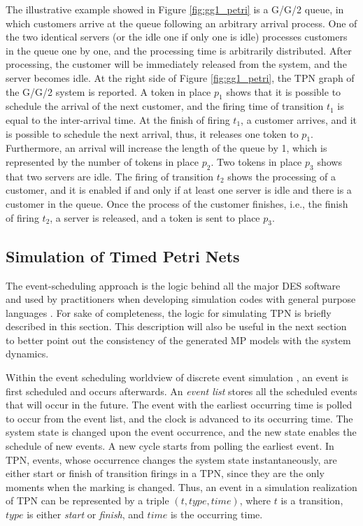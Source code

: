 \documentclass[suppldata]{interact}
\theoremstyle{plain}
\theoremstyle{definition}
\theoremstyle{remark}
\begin{document}
The illustrative example showed in Figure \ref{fig:gg1_petri} is a G/G/2 queue, in which customers arrive at the queue following an arbitrary arrival process. One of the two identical servers (or the idle one if only one is idle) processes customers in the queue one by one, and the processing time is arbitrarily distributed. After processing, the customer will be immediately released from the system, and the server becomes idle. At the right side of Figure \ref{fig:gg1_petri}, the TPN graph of the G/G/2 system is %
reported. A token in place $p_1$ shows that it is possible to schedule the arrival of the next customer, and the firing time of transition $t_1$ is equal to the inter-arrival time. At the finish of firing $t_1$, a customer arrives, and it is possible to schedule the next arrival, thus, it releases one token to $p_1$. Furthermore, an arrival will increase the length of the queue by 1, which is represented by the number of tokens in place $p_2$. Two tokens in place $p_3$ shows that two servers are idle. The firing of transition $t_2$ shows the processing of a customer, and it is enabled if and only if at least one server is idle and there is a customer in the queue. Once the process of the customer finishes, i.e., the finish of firing $t_2$, a server is released, and a token is sent to place $p_3$.


\subsection{Simulation of Timed Petri Nets}\label{sec:ModelSim}
The event-scheduling approach is the logic behind all the major DES software and used by practitioners when developing simulation codes with general purpose languages \citep{law2014simulation}. For sake of completeness, the logic for simulating TPN is briefly described in this section. This description will also be useful in the next section to better point out the consistency of the generated MP models with the system dynamics. 

Within the event scheduling worldview of discrete event simulation \citep{zeigler2018theory}, an event is first scheduled and occurs afterwards. 
An \textit{event list} stores all the scheduled events that will occur in the future. The event with the earliest occurring time is polled to occur from the event list, and the clock is advanced to its occurring time. The system state is changed upon the event occurrence, and the new state enables the schedule of new events. A new cycle starts from polling the earliest event. In TPN, events, whose occurrence changes the system state instantaneously, are either start or finish of transition firings in a TPN, since they are the only moments when the marking is changed. Thus, an event in a simulation realization of TPN can be represented by a triple $(t,type,time)$, where $t$ is a transition, $type$ is either \textit{start} or \textit{finish}, and $time$ is the occurring time. 
\end{document}
